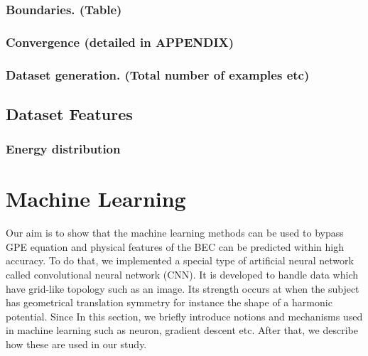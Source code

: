 \documentclass[a4paper,times,hidelinks,12pt]{article}
\begin{document}
\subsubsection{Boundaries. (Table)}
\subsubsection{Convergence (detailed in APPENDIX)}
\subsubsection{Dataset generation. (Total number of examples etc)}

\subsection{Dataset Features}
\subsubsection{Energy distribution}

%		


\section{Machine Learning}
\label{sec:machine_learning}

Our aim is to show that the machine learning methods can be used to bypass GPE equation and physical features of the BEC can be predicted within high accuracy. To do that, we implemented a special type of artificial neural network called convolutional neural network (CNN). It is developed to handle data which have grid-like topology \cite{goodfellow2016deep} such as an image. Its strength occurs at when the subject has geometrical translation symmetry for instance the shape of a harmonic potential. Since In this section, we briefly introduce notions and mechanisms used in machine learning such as neuron, gradient descent etc. After that, we describe how these are used in our study.  
\end{document}

